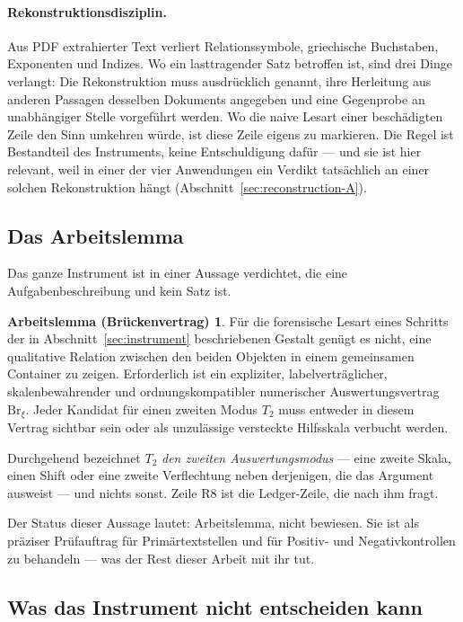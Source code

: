 \documentclass[11pt,a4paper]{article}
\theoremstyle{definition}
\newtheorem*{workinglemma}{Arbeitslemma (Brückenvertrag)}
\newcommand{\Brxi}{\mathrm{Br}_{\xi}}
\begin{document}
\paragraph{Rekonstruktionsdisziplin.}
\label{sec:reconstruction}
Aus PDF extrahierter Text verliert Relationssymbole, griechische Buchstaben,
Exponenten und Indizes. Wo ein lasttragender Satz betroffen ist, sind drei Dinge
verlangt: Die Rekonstruktion muss ausdrücklich genannt, ihre Herleitung aus
anderen Passagen desselben Dokuments angegeben und eine Gegenprobe an
unabhängiger Stelle vorgeführt werden. Wo die naive Lesart einer beschädigten
Zeile den Sinn umkehren würde, ist diese Zeile eigens zu markieren. Die Regel ist
Bestandteil des Instruments, keine Entschuldigung dafür --- und sie ist hier
relevant, weil in einer der vier Anwendungen ein Verdikt tatsächlich an einer
solchen Rekonstruktion hängt (Abschnitt~\ref{sec:reconstruction-A}).

\subsection{Das Arbeitslemma}

Das ganze Instrument ist in einer Aussage verdichtet, die eine Aufgabenbeschreibung
und kein Satz ist.

\begin{workinglemma}
Für die forensische Lesart eines Schritts der in
Abschnitt~\ref{sec:instrument} beschriebenen Gestalt genügt es nicht, eine
qualitative Relation zwischen den beiden Objekten in einem gemeinsamen Container
zu zeigen. Erforderlich ist ein expliziter, labelverträglicher, skalenbewahrender
und ordnungskompatibler numerischer Auswertungsvertrag $\Brxi$. Jeder Kandidat
für einen zweiten Modus $T_2$ muss entweder in diesem Vertrag sichtbar sein oder
als unzulässige versteckte Hilfsskala verbucht werden.
\end{workinglemma}

Durchgehend bezeichnet $T_2$ \emph{den zweiten Auswertungsmodus} --- eine zweite
Skala, einen Shift oder eine zweite Verflechtung neben derjenigen, die das
Argument ausweist --- und nichts sonst. Zeile R8 ist die Ledger-Zeile, die nach
ihm fragt.

Der Status dieser Aussage lautet: Arbeitslemma, nicht bewiesen. Sie ist als
präziser Prüfauftrag für Primärtextstellen und für Positiv- und Negativkontrollen
zu behandeln --- was der Rest dieser Arbeit mit ihr tut.

\subsection{Was das Instrument nicht entscheiden kann}
\label{sec:cannot}
\end{document}
